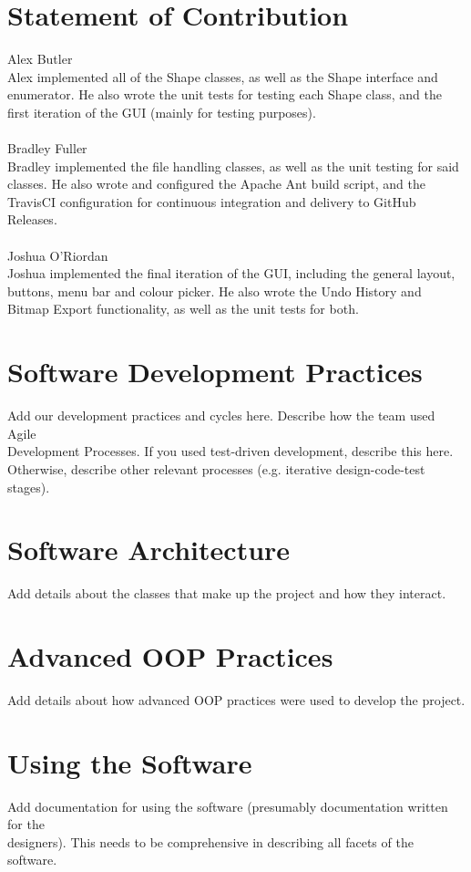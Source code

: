 \documentclass[12pt]{article} %
\begin{document}
\newpage

\section{Statement of Contribution}

{\large Alex Butler}\\
Alex implemented all of the Shape classes, as well as the Shape interface and enumerator. He also wrote the unit tests for testing each Shape class, and the first iteration of the GUI (mainly for testing purposes). 
\\\\{\large Bradley Fuller}\\
Bradley implemented the file handling classes, as well as the unit testing for said classes. He also wrote and configured the Apache Ant build script, and the TravisCI configuration for continuous integration and delivery to GitHub Releases.
\\\\{\large Joshua O'Riordan}\\
Joshua implemented the final iteration of the GUI, including the general layout, buttons, menu bar and colour picker. He also wrote the Undo History and Bitmap Export functionality, as well as the unit tests for both.

\newpage

\section{Software Development Practices}

Add our development practices and cycles here. Describe how the team used Agile \\
Development Processes. If you used test-driven development, describe this here.\\
Otherwise, describe other relevant processes (e.g. iterative design-code-test stages).

\newpage

\section{Software Architecture}

Add details about the classes that make up the project and how they interact.

\newpage

\section{Advanced OOP Practices}

Add details about how advanced OOP practices were used to develop the project.

\newpage

\section{Using the Software}

Add documentation for using the software (presumably documentation written for the
\\ designers). This needs to be comprehensive in describing all facets of the software.
\end{document}
